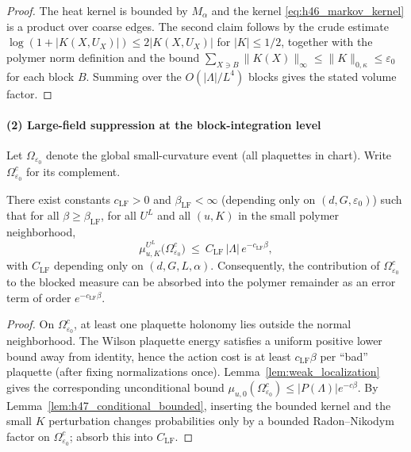 \begin{proof}
The heat kernel is bounded by $M_\alpha$ and the kernel \eqref{eq:h46_markov_kernel} is a product over coarse edges.
The second claim follows by the crude estimate
$\log(1+|K(X,U_X)|)\le 2|K(X,U_X)|$ for $|K|\le 1/2$, together with the polymer norm definition and the bound
$\sum_{X\ni B}\|K(X)\|_\infty\le \|K\|_{0,\kappa}\le \varepsilon_0$ for each block $B$.
Summing over the $O(|\Lambda|/L^4)$ blocks gives the stated volume factor.
\end{proof}

\paragraph*{(2) Large-field suppression at the block-integration level}

Let $\Omega_{\varepsilon_0}$ denote the global small-curvature event (all plaquettes in chart).
Write $\Omega_{\varepsilon_0}^c$ for its complement.

\begin{lemma}\label{lem:h47_large_field_tail}
There exist constants $c_{\mathrm{LF}}>0$ and $\beta_{\mathrm{LF}}<\infty$ (depending only on $(d,G,\varepsilon_0)$) such that for all
$\beta\ge\beta_{\mathrm{LF}}$, for all $U^L$ and all $(u,K)$ in the small polymer neighborhood,
\begin{equation}\label{eq:h47_large_field_tail}
\mu_{u,K}^{U^L}\bigl(\Omega_{\varepsilon_0}^c\bigr)\ \le\ C_{\mathrm{LF}}\,|\Lambda|\,e^{-c_{\mathrm{LF}}\beta},
\end{equation}
with $C_{\mathrm{LF}}$ depending only on $(d,G,L,\alpha)$.
Consequently, the contribution of $\Omega_{\varepsilon_0}^c$ to the blocked measure can be absorbed into the polymer remainder as an
error term of order $e^{-c_{\mathrm{LF}}\beta}$.
\end{lemma}

\begin{proof}
On $\Omega_{\varepsilon_0}^c$, at least one plaquette holonomy lies outside the normal neighborhood.
The Wilson plaquette energy satisfies a uniform positive lower bound away from identity, hence the action cost is at least
$c_{\mathrm{LF}}\beta$ per ``bad'' plaquette (after fixing normalizations once).
Lemma~\ref{lem:weak_localization} gives the corresponding unconditional bound
$\mu_{u,0}(\Omega_{\varepsilon_0}^c)\le |P(\Lambda)|e^{-c\beta}$.
By Lemma~\ref{lem:h47_conditional_bounded}, inserting the bounded kernel and the small $K$ perturbation changes probabilities only by a bounded
Radon--Nikodym factor on $\Omega_{\varepsilon_0}^c$; absorb this into $C_{\mathrm{LF}}$.
\end{proof}


